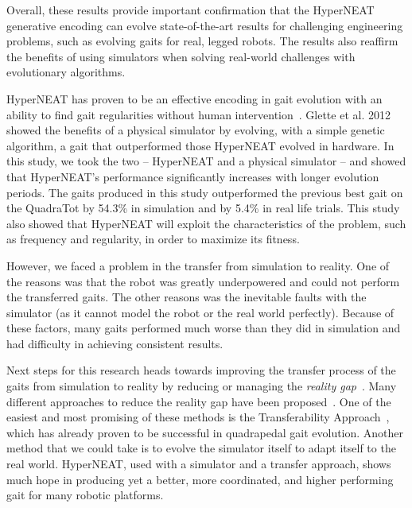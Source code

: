 
 Overall, these results provide important confirmation that the HyperNEAT generative encoding can evolve state-of-the-art results for challenging engineering problems, such as evolving gaits for real, legged robots. The results also reaffirm the benefits of using simulators when solving real-world challenges with evolutionary algorithms. 



HyperNEAT has proven to be an effective encoding in gait evolution with an ability to find gait regularities without human intervention~\cite{clune2009evolving,clune2011performance,yos:clune}. Glette et al. 2012~\cite{glette} showed the benefits of a physical simulator by evolving, with a simple genetic algorithm, a gait that outperformed those HyperNEAT evolved in hardware.
In this study, we took the two -- HyperNEAT and a physical simulator -- and showed that HyperNEAT's performance significantly increases with longer evolution periods. The gaits produced in this study outperformed the previous best gait on the QuadraTot by 54.3\% in simulation and by 5.4\% in real life trials. This study also showed that HyperNEAT will exploit the characteristics of the problem, such as frequency and regularity, in order to maximize its fitness.


However, we faced a problem in the transfer from simulation to reality. %
One of the reasons was that the robot was greatly underpowered and could not perform the transferred gaits. The other reasons was the inevitable faults with the simulator (as it cannot model the robot or the real world perfectly). Because of these factors, many gaits performed much worse than they did in simulation and had difficulty in achieving consistent results. 


Next steps for this research heads towards improving the transfer process of the gaits from simulation to reality by reducing or managing the \emph{reality gap}~\cite{jakobi}. Many different approaches to reduce the reality gap have been proposed~\cite{koos2010crossing,bongard,zagal}. One of the easiest and most promising of these methods is the Transferability Approach~\cite{koos2011transferability}, which has already proven to be successful in quadrapedal gait evolution. Another method that we could take is to evolve the simulator itself to adapt itself to the real world. HyperNEAT, used with a simulator and a transfer approach, shows much hope in producing yet a better, more coordinated, and higher performing gait for many robotic platforms.
